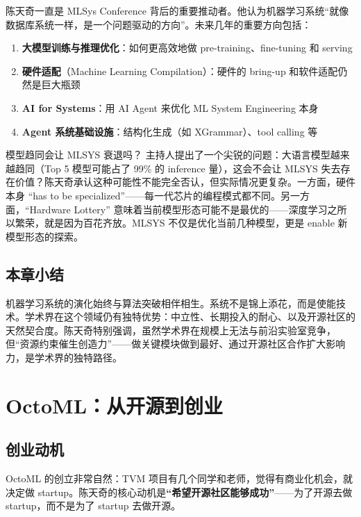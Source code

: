 \documentclass[a4paper]{article}
\begin{document}
陈天奇一直是 MLSys Conference 背后的重要推动者。他认为机器学习系统``就像数据库系统一样，是一个问题驱动的方向''。未来几年的重要方向包括：

\begin{enumerate}
    \item \textbf{大模型训练与推理优化}：如何更高效地做 pre-training、fine-tuning 和 serving
    \item \textbf{硬件适配}（Machine Learning Compilation）：硬件的 bring-up 和软件适配仍然是巨大瓶颈
    \item \textbf{AI for Systems}：用 AI Agent 来优化 ML System Engineering 本身
    \item \textbf{Agent 系统基础设施}：结构化生成（如 XGrammar）、tool calling 等
\end{enumerate}

\begin{knowledgebox}{模型趋同会让 MLSYS 衰退吗？}
主持人提出了一个尖锐的问题：大语言模型越来越趋同（Top 5 模型可能占了 99\% 的 inference 量），这会不会让 MLSYS 失去存在价值？陈天奇承认这种可能性不能完全否认，但实际情况更复杂。一方面，硬件本身 ``has to be specialized''------每一代芯片的编程模式都不同。另一方面，``Hardware Lottery'' 意味着当前模型形态可能不是最优的------深度学习之所以繁荣，就是因为百花齐放。MLSYS 不仅是优化当前几种模型，更是 enable 新模型形态的探索。
\end{knowledgebox}

\subsection{本章小结}

机器学习系统的演化始终与算法突破相伴相生。系统不是锦上添花，而是使能技术。学术界在这个领域仍有独特优势：中立性、长期投入的耐心、以及开源社区的天然契合度。陈天奇特别强调，虽然学术界在规模上无法与前沿实验室竞争，但``资源约束催生创造力''------做关键模块做到最好、通过开源社区合作扩大影响力，是学术界的独特路径。

\section{OctoML：从开源到创业}

\subsection{创业动机}

OctoML 的创立非常自然：TVM 项目有几个同学和老师，觉得有商业化机会，就决定做 startup。陈天奇的核心动机是\textbf{``希望开源社区能够成功''}------为了开源去做 startup，而不是为了 startup 去做开源。
\end{document}
